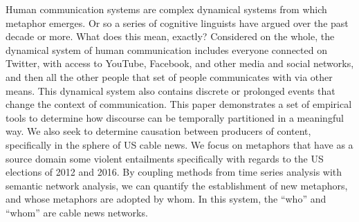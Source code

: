 Human communication systems are complex dynamical systems from which metaphor 
emerges. Or so a series of cognitive linguists have argued over the past decade
or more. What does this mean, exactly? Considered on the whole, the dynamical
system of human communication includes everyone connected on Twitter, with access 
to YouTube, Facebook, and other media and social networks, and then all the
other people that set of people communicates with via other means. 
This dynamical system also contains discrete or prolonged events that change
the context of communication.
This paper demonstrates a set of empirical tools to determine how discourse
can be temporally partitioned in a meaningful way. We also seek to determine 
causation between producers of content,
specifically in the sphere of US cable news. We focus on metaphors that have
as a source domain some violent entailments specifically with regards to the
US elections of 2012 and 2016. By coupling methods from time series analysis 
with semantic network analysis, we can quantify the establishment of new 
metaphors, and whose metaphors are adopted by whom. In this system, the 
``who'' and ``whom'' are cable news networks. 
